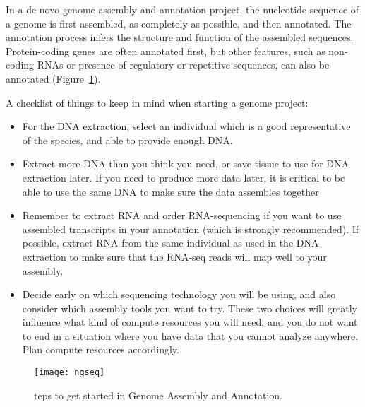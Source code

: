 In a de novo genome assembly and annotation project, the nucleotide sequence of a genome is first assembled, as completely as possible, and then annotated. The annotation process infers the structure and function of the assembled sequences. Protein-coding genes are often annotated first, but other features, such as non-coding RNAs or presence of regulatory or repetitive sequences, can also be annotated (Figure~\ref{fig:ngssteps}).

A checklist of things to keep in mind when starting a genome project:

\begin{itemize}
	\item For the DNA extraction, select an individual which is a good representative of the species, and able to provide enough DNA.
	
	\item Extract more DNA than you think you need, or save tissue to use for DNA extraction later. If you need to produce more data later, it is critical to be able to use the same DNA to make sure the data assembles together
	
	\item Remember to extract RNA and order RNA-sequencing if you want to use assembled transcripts in your annotation (which is strongly recommended). If possible, extract RNA from the same individual as used in the DNA extraction to make sure that the RNA-seq reads will map well to your assembly.
	
	\item Decide early on which sequencing technology you will be using, and also consider which assembly tools you want to try. These two choices will greatly influence what kind of compute resources you will need, and you do not want to end in a situation where you have data that you cannot analyze anywhere. Plan compute resources accordingly.
	
\end{itemize}
\begin{figure}
	\centering
	\texttt{[image: ngseq]}
	\caption{teps to get started in Genome Assembly and Annotation.}
	\label{fig:ngssteps}
\end{figure}

